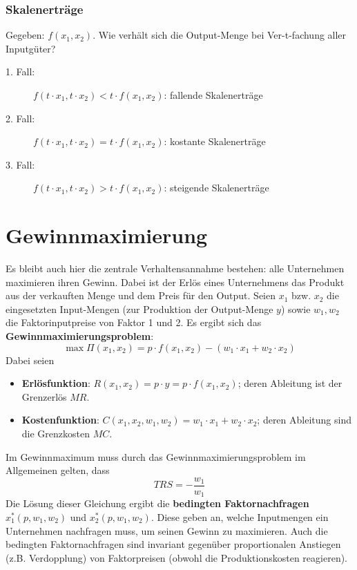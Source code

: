 
\subsubsection*{Skalenerträge}
Gegeben: $f(x_1, x_2)$. Wie verhält sich die Output-Menge bei Ver-t-fachung aller Inputgüter?
\begin{description}
	\item[\hspace{0.5cm}1. Fall:] $f( t \cdot x_1, t \cdot x_2) < t \cdot f(x_1, x_2)$: fallende Skalenerträge 
	\item[\hspace{0.5cm}2. Fall:] $f( t \cdot x_1, t \cdot x_2) = t \cdot f(x_1, x_2)$: kostante Skalenerträge 
	\item[\hspace{0.5cm}3. Fall:] $f( t \cdot x_1, t \cdot x_2) > t \cdot f(x_1, x_2)$: steigende Skalenerträge 	
\end{description}

\section{Gewinnmaximierung}

Es bleibt auch hier die zentrale Verhaltensannahme bestehen: alle Unternehmen maximieren ihren Gewinn. Dabei ist der Erlös eines Unternehmens das Produkt aus der verkauften Menge und dem Preis für den Output. Seien $x_1$ bzw. $x_2$ die eingesetzten Input-Mengen (zur Produktion der Output-Menge $y$) sowie $w_1, w_2$ die Faktorinputpreise von Faktor 1 und 2. Es ergibt sich das \textbf{Gewinnmaximierungsproblem}:
$$ \max \Pi(x_1, x_2) = p \cdot f(x_1, x_2) - (w_1 \cdot x_1 + w_2 \cdot x_2) $$
Dabei seien 
\begin{itemize}
	\item \textbf{Erlösfunktion}: $R(x_1, x_2) = p \cdot y = p \cdot f(x_1, x_2)$; deren Ableitung ist der Grenzerlös $MR$.
	\item \textbf{Kostenfunktion}: $C(x_1, x_2, w_1, w_2) = w_1 \cdot x_1 + w_2 \cdot x_2$; deren Ableitung sind die Grenzkosten $MC$.
\end{itemize}
Im Gewinnmaximum muss durch das Gewinnmaximierungsproblem im Allgemeinen gelten, dass 
$$ TRS = - \frac{w_1}{w_1} $$
Die Lösung dieser Gleichung ergibt die \textbf{bedingten Faktornachfragen} $x_1^*(p, w_1, w_2)$ und $x_2^*(p, w_1, w_2)$. Diese geben an, welche Inputmengen ein Unternehmen nachfragen muss, um seinen Gewinn zu maximieren. Auch die bedingten Faktornachfragen sind invariant gegenüber proportionalen Anstiegen (z.B. Verdopplung) von Faktorpreisen (obwohl die Produktionskosten reagieren).

